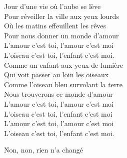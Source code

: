 \documentclass{novel}
\begin{document}
Jour d'une vie où l'aube se lève \\
Pour réveiller la ville aux yeux lourds \\
Où les matins effeuillent les rêves \\
Pour nous donner un monde d'amour \\

L'amour c'est toi, l'amour c'est moi \\
L'oiseau c'est toi, l'enfant c'est moi. \\

Comme un enfant aux yeux de lumière \\
Qui voit passer au loin les oiseaux \\
Comme l'oiseau bleu survolant la terre \\
Nous trouverons ce monde d'amour \\

L'amour c'est toi, l'amour c'est moi \\
L'oiseau c'est toi, l'enfant c'est moi \\

L'amour c'est toi, l'amour c'est moi \\
L'oiseau c'est toi, l'enfant c'est moi.


\newpage
\footnotesize

\h*{Non, non, rien n’a changé}
\end{document}

